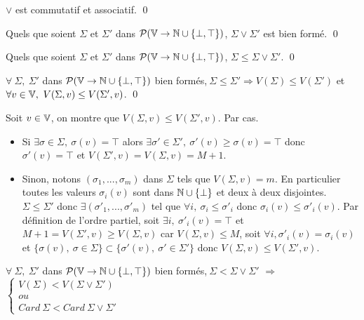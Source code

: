\begin{prop}
 $\vee$ est commutatif et associatif. \qed
\end{prop}

\begin{prop}
Quels que soient $\Sigma$ et $\Sigma'$ dans $\mathcal P(\mathbb V\rightarrow\mathbb N\cup\{\bot,\top\})$, $\Sigma\vee\Sigma'$ est bien formé. \qed
\end{prop}

\begin{prop}
\label{propSup}
Quels que soient $\Sigma$ et $\Sigma'$ dans $\mathcal P(\mathbb V\rightarrow\mathbb N\cup\{\bot,\top\})$, $\Sigma\leq\Sigma\vee\Sigma'$. \qed
\end{prop}

\begin{prop}
\label{propCard}
 $\forall\ \Sigma,\ \Sigma'$ dans $\mathcal P(\mathbb V\rightarrow\mathbb N\cup\{\bot,\top\})$ bien formés,$\ \Sigma \leq \Sigma'\Rightarrow V(\Sigma) \leq V(\Sigma')$ et $\forall v\in\mathbb V,\ V(\Sigma,v) \leq V(\Sigma',v)$. \qed
\end{prop}

\begin{pr}
 Soit $v\in\mathbb V$, on montre que $V(\Sigma,v)\leq V(\Sigma',v)$. Par cas.
 \begin{itemize}
  \item Si $\exists \sigma\in\Sigma,\ \sigma(v)=\top$ alors $\exists \sigma'\in\Sigma',\ \sigma'(v)\geq\sigma(v)=\top$ donc $\sigma'(v)=\top$ et $V(\Sigma',v)=V(\Sigma,v)=M+1$.
  \item Sinon, notons $(\sigma_1,...,\sigma_m)$ dans $\Sigma$ tels que $V(\Sigma,v)=m$. En particulier toutes les valeurs $\sigma_i(v)$ sont dans $\mathbb N\cup\{\bot\}$ et deux à deux disjointes. $\Sigma\leq\Sigma'$ donc $\exists (\sigma'_1,...,\sigma'_m)$ tel que $\forall i,\ \sigma_i\leq\sigma'_i$ donc $\sigma_i(v)\leq\sigma'_i(v)$. Par définition de l'ordre partiel, soit $\exists i,\ \sigma'_i(v)=\top$ et $M+1=V(\Sigma',v)\geq V(\Sigma,v)$ car $V(\Sigma,v)\leq M$, soit $\forall i, \sigma'_i(v)=\sigma_i(v)$ et $\{\sigma(v),\ \sigma\in\Sigma\}\subset\{\sigma'(v),\ \sigma'\in\Sigma'\}$ donc $V(\Sigma,v)\leq V(\Sigma',v)$.
 \end{itemize}
\end{pr}


\begin{prop}
\label{propCard2}
 $\forall\ \Sigma,\ \Sigma'$ dans $\mathcal P(\mathbb V\rightarrow\mathbb N\cup\{\bot,\top\})$ bien formés,$\ \Sigma < \Sigma\vee\Sigma'$ $\Rightarrow$ 
 $\left\{
  \begin{array}{ll}
	  V(\Sigma) < V(\Sigma\vee\Sigma')
	\\ou
	\\Card\ \Sigma < Card\ \Sigma\vee\Sigma'
  \end{array}
\right.$
\end{prop}

